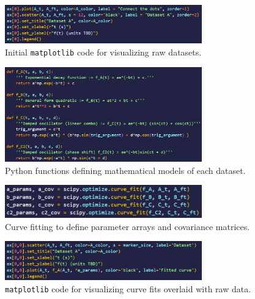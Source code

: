 \documentclass{article}
\begin{document}
\begin{figure}[ht]
    \centering

    \includegraphics[width=0.76\textwidth]{../figures/plot_code.png}

    \caption{Initial \texttt{matplotlib} code for visualizing raw datasets.}

    \label{fig:plot1}
\end{figure}


\begin{figure}[ht]
    \centering

    \includegraphics[width=0.76\textwidth]{../figures/func_code.png}

    \caption{Python functions defining mathematical models of each dataset.}

    \label{fig:func}
\end{figure}

\begin{figure}[ht]
    \centering

    \includegraphics[width=0.76\textwidth]{../figures/fit_code.png}

    \caption{Curve fitting to define parameter arrays and covariance matrices.}

    \label{fig:fitcode}
\end{figure}


\begin{figure}[ht]
    \centering

    \includegraphics[width=0.76\textwidth]{../figures/plot2_code.png}

    \caption{\texttt{matplotlib} code for visualizing curve fits overlaid with raw data.}

    \label{fig:plot2}
\end{figure}
\end{document}
